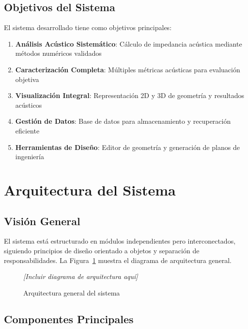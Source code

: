 \documentclass[12pt,a4paper,twocolumn]{article}
\begin{document}
\subsection{Objetivos del Sistema}

El sistema desarrollado tiene como objetivos principales:

\begin{enumerate}
    \item \textbf{Análisis Acústico Sistemático}: Cálculo de impedancia acústica mediante métodos numéricos validados
    \item \textbf{Caracterización Completa}: Múltiples métricas acústicas para evaluación objetiva
    \item \textbf{Visualización Integral}: Representación 2D y 3D de geometría y resultados acústicos
    \item \textbf{Gestión de Datos}: Base de datos para almacenamiento y recuperación eficiente
    \item \textbf{Herramientas de Diseño}: Editor de geometría y generación de planos de ingeniería
\end{enumerate}

\section{Arquitectura del Sistema}

\subsection{Visión General}

El sistema está estructurado en módulos independientes pero interconectados, siguiendo principios de diseño orientado a objetos y separación de responsabilidades. La Figura~\ref{fig:arquitectura} muestra el diagrama de arquitectura general.

\begin{figure}[H]
\centering
\caption{Arquitectura general del sistema}
\label{fig:arquitectura}
\textit{[Incluir diagrama de arquitectura aquí]}
\end{figure}

\subsection{Componentes Principales}
\end{document}
